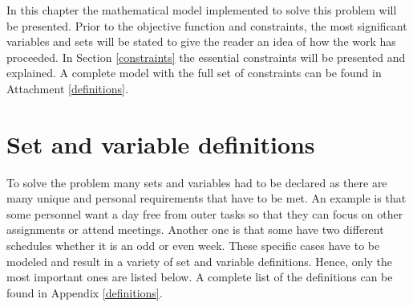 In this chapter the mathematical model implemented to solve this problem will be presented. Prior to the objective function and constraints, the most significant variables and sets will be stated to give the reader an idea of how the work has proceeded. In Section \ref{constraints} the essential constraints will be presented and explained. A complete model with the full set of constraints can be found in Attachment \ref{definitions}. %
\section{Set and variable definitions} \label{variables}
To solve the problem many sets and variables had to be declared as there are many unique and personal requirements that have to be met. An example is that some personnel want a day free from outer tasks so that they can focus on other assignments or attend meetings. Another one is that some have two different schedules whether it is an odd or even week. These specific cases have to be modeled and result in a variety of set and variable definitions. Hence, only the most important ones are listed below. A complete list of the definitions can be found in Appendix \ref{definitions}. \\
 \\
  \\
	 	\\
                                                                \\
                                                       \\
                                                   \\
                                                \\

